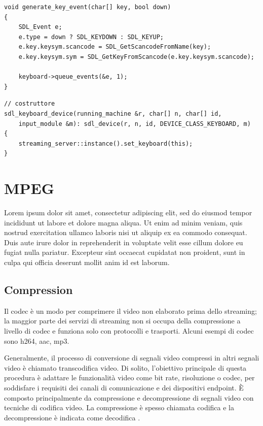 \begin{lstlisting}[caption=Codice relativo alla gestione input lato server: modulo server. File: \detokenize{lib/util/streaming_server.hpp}, label={lst:generate_key_event}]
void generate_key_event(char[] key, bool down)
{
	SDL_Event e;
	e.type = down ? SDL_KEYDOWN : SDL_KEYUP;
	e.key.keysym.scancode = SDL_GetScancodeFromName(key);
	e.key.keysym.sym = SDL_GetKeyFromScancode(e.key.keysym.scancode);

	keyboard->queue_events(&e, 1);
}
\end{lstlisting}

\begin{lstlisting}[caption=Codice relativo alla gestione input lato server: modulo SDL. File: \detokenize{osd/modules/input/input_sdl.cpp}, label={lst:sdl_keyboard_device}]
// costruttore
sdl_keyboard_device(running_machine &r, char[] n, char[] id,
	input_module &m): sdl_device(r, n, id, DEVICE_CLASS_KEYBOARD, m)
{
	streaming_server::instance().set_keyboard(this);
}
\end{lstlisting}
	
\section{MPEG} \label{sec:cap3_MPEG}
Lorem ipsum dolor sit amet, consectetur adipiscing elit, sed do eiusmod tempor incididunt ut labore et dolore magna aliqua. Ut enim ad minim veniam, quis nostrud exercitation ullamco laboris nisi ut aliquip ex ea commodo consequat. Duis aute irure dolor in reprehenderit in voluptate velit esse cillum dolore eu fugiat nulla pariatur. Excepteur sint occaecat cupidatat non proident, sunt in culpa qui officia deserunt mollit anim id est laborum.

\subsection{Compression}
Il codec è un modo per comprimere il video non elaborato prima dello streaming; la maggior parte dei servizi di streaming non si occupa della compressione a livello di codec e funziona solo con protocolli e trasporti. Alcuni esempi di codec sono h264, aac, mp3.

Generalmente, il processo di conversione di segnali video compressi in altri segnali video è chiamato transcodifica video. Di solito, l'obiettivo principale di questa procedura è adattare le funzionalità video come bit rate, risoluzione o codec, per soddisfare i requisiti dei canali di comunicazione e dei dispositivi endpoint. È composto principalmente da compressione e decompressione di segnali video con tecniche di codifica video. La compressione è spesso chiamata codifica e la decompressione è indicata come decodifica \parencite{CombinedICTTechnologies}.

